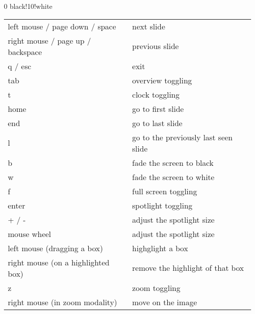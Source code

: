 \begin{frame}
\thispagestyle{empty}


\begin{footnotesize}

\begin{table}[!htb]
\begin{center}
\rowcolors
{0}					%
{black!10!white}	%
{}					%
\begin{tabular}
{
	>{\arraybackslash \columncolor{black!05!white}}	p{}	<{}
	>{\arraybackslash}								p{}	<{}
}

left mouse / %
page down / %
space								& next slide \\
right mouse / %
page up / %
backspace							& previous slide \\
q / %
esc									& exit \\
tab									& overview toggling \\
t									& clock toggling \\
home								& go to first slide \\
end									& go to last slide \\
l									& go to the previously last seen slide \\
b									& fade the screen to black \\
w									& fade the screen to white \\
f									& full screen toggling \\
enter								& spotlight toggling \\
+ / -								& adjust the spotlight size \\
mouse wheel							& adjust the spotlight size \\
left mouse (dragging a box)			& highglight a box \\
right mouse (on a highlighted box)	& remove the highlight of that box \\
z									& zoom toggling \\
right mouse (in zoom modality)		& move on the image \\

\end{tabular}
\end{center}
\end{table}

\end{footnotesize}


\end{frame}
